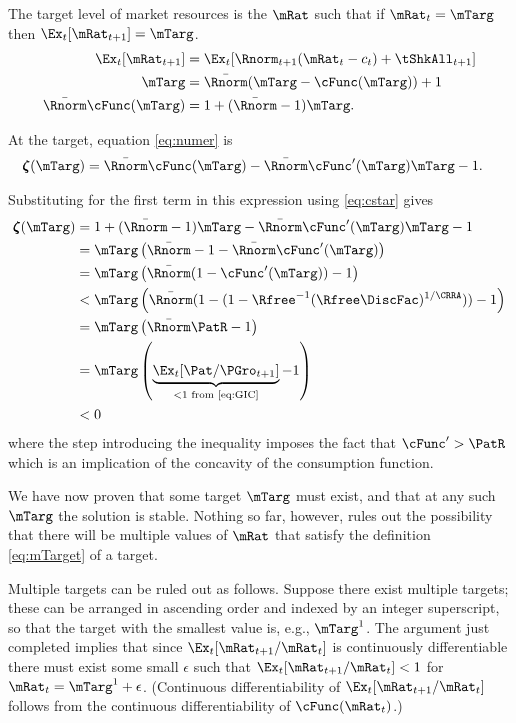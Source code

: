 \documentclass[./BufferStockTheory.tex]{subfiles}
\begin{document}
The target level of market resources is the $\mRat$ such that if $\mRat_{t}=\mTarg$ then $\Ex_{t}[\mRat_{t+1}]=\mTarg$.
\begin{align}
\Ex_{t}[{\mRat}_{t+1}]  & = \Ex_{t}[{\Rnorm}_{t+1}(\mRat_{t}-c_{t})+{%
\tShkAll}_{t+1}] \nonumber \\
\mTarg  & = \bar{\Rnorm}(\mTarg-\cFunc(\mTarg))+1  \nonumber \\
\bar{\Rnorm}\cFunc(\mTarg)  & = 1+(\bar{\Rnorm}-1)\mTarg  \label{eq:cstar}.
\end{align}

At the target, equation \eqref{eq:numer} is
\begin{align}
\numFunc(\mTarg)  & = \bar{\Rnorm}\cFunc(\mTarg) - \bar{\Rnorm}\cFunc^{\prime}(\mTarg)\mTarg - 1.  \nonumber 
\end{align}

Substituting for the first term in this expression using
\eqref{eq:cstar} gives
\begin{align*}
\numFunc(\mTarg)  & = 1+(\bar{\Rnorm}-1)\mTarg- \bar{\Rnorm}\cFunc^{\prime}(\mTarg)\mTarg - 1 \\
 & = \mTarg\left(\bar{\Rnorm}-1-\bar{\Rnorm}\cFunc^{\prime}(\mTarg)\right) \\
 & = \mTarg\left(\bar{\Rnorm}(1-\cFunc^{\prime}(\mTarg))-1\right) \\
 & < \mTarg\left(\bar{\Rnorm}(1-(1-{\Rfree}^{-1}(\Rfree\DiscFac)^{1/%
\CRRA}))-1\right) \\
 & = \mTarg\left(\bar{\Rnorm}\PatR-1%
\right) \\
 & = \mTarg\left(\underbrace{\Ex_{t}[{\Pat}/{\PGro}_{t+1}]}_{<
1\text{~from \eqref{eq:GIC}}}-1\right) \\
 & < 0
\end{align*}
where the step introducing the inequality imposes the fact that $\cFunc^{\prime} > \PatR$ which is an
implication of the concavity of the consumption function.

We have now proven that some target $\mTarg$ must exist, and that at any such
$\mTarg$ the solution is stable. Nothing so far, however, rules
out the possibility that there will be multiple values of $\mRat$ that
satisfy the definition \eqref{eq:mTarget} of a target.

Multiple targets can be ruled out as follows. Suppose there exist
multiple targets; these can be arranged in ascending order and indexed
by an integer superscript, so that the target with the smallest value is,
e.g., $\mTarg^{1}$. The argument just completed implies that since
$\Ex_{t}[{\mRat}_{t+1}/\mRat_{t}]$ is continuously differentiable
there must exist some small $\epsilon$ such that
$\Ex_{t}[{\mRat}_{t+1}/\mRat_{t}] < 1$ for $\mRat_{t} =
\mTarg^{1}+\epsilon$. (Continuous differentiability of
$\Ex_{t}[{\mRat}_{t+1}/\mRat_{t}]$ follows from the continuous
differentiability of $\cFunc(\mRat_{t})$.) 
\end{document}

